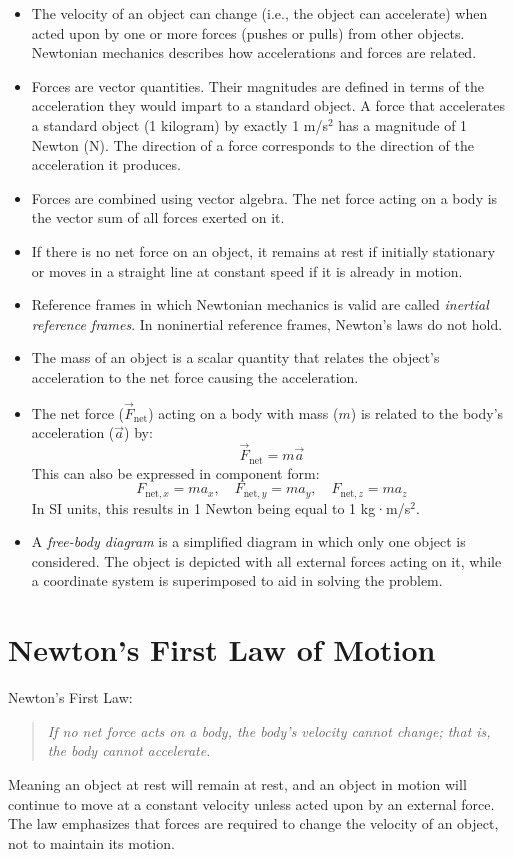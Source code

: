 \documentclass{article}
\begin{document}
\begin{itemize}
    \item The velocity of an object can change (i.e., the object can accelerate) when acted upon by one or more forces (pushes or pulls) from other objects. Newtonian mechanics describes how accelerations and forces are related.

    \item Forces are vector quantities. Their magnitudes are defined in terms of the acceleration they would impart to a standard object. A force that accelerates a standard object (1 kilogram) by exactly 1 m/s\(^2\) has a magnitude of 1 Newton (N). The direction of a force corresponds to the direction of the acceleration it produces.

    \item Forces are combined using vector algebra. The net force acting on a body is the vector sum of all forces exerted on it.

    \item If there is no net force on an object, it remains at rest if initially stationary or moves in a straight line at constant speed if it is already in motion.

    \item Reference frames in which Newtonian mechanics is valid are called \textit{inertial reference frames}. In noninertial reference frames, Newton's laws do not hold.

    \item The mass of an object is a scalar quantity that relates the object's acceleration to the net force causing the acceleration.

    \item The net force (\(\vec{F}_{\text{net}}\)) acting on a body with mass (\(m\)) is related to the body's acceleration (\(\vec{a}\)) by:
    \[
    \vec{F}_{\text{net}} = m \vec{a}
    \]
    This can also be expressed in component form:
    \[
    F_{\text{net}, x} = m a_x, \quad F_{\text{net}, y} = m a_y, \quad F_{\text{net}, z} = m a_z
    \]
    In SI units, this results in 1 Newton being equal to 1 kg·m/s\(^2\).

    \item A \textit{free-body diagram} is a simplified diagram in which only one object is considered. The object is depicted with all external forces acting on it, while a coordinate system is superimposed to aid in solving the problem.
\end{itemize}

\section*{Newton's First Law of Motion}
Newton's First Law:
\begin{quote}
    \textit{If no net force acts on a body, the body’s velocity cannot change; that is, the body cannot accelerate.}
\end{quote}
Meaning an object at rest will remain at rest, and an object in motion will continue to move at a constant velocity unless acted upon by an external force. The law emphasizes that forces are required to change the velocity of an object, not to maintain its motion.
\end{document}
